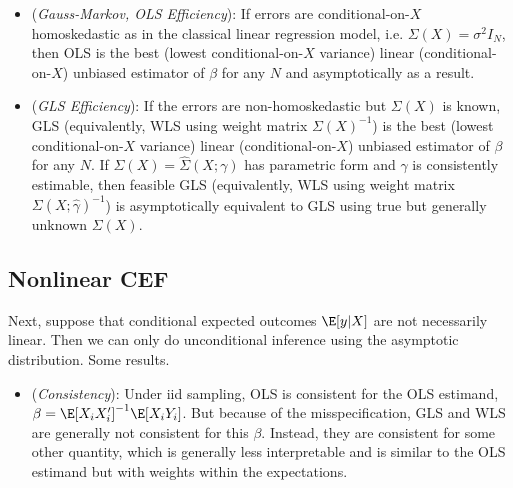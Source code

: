 \documentclass[12pt]{article}
\theoremstyle{plain}
\theoremstyle{definition}
\theoremstyle{remark}
\begin{document}
\begin{itemize}
  \item
    (\emph{Gauss-Markov, OLS Efficiency}):
    If errors are conditional-on-$X$ homoskedastic as in the
    classical linear regression model, i.e.
    $\Sigma(X)=\sigma^2 I_N$, then OLS is the best
    (lowest conditional-on-$X$ variance) linear (conditional-on-$X$)
    unbiased estimator of ${\beta}$ for any $N$ and asymptotically
    as a result.

  \item
    (\emph{GLS Efficiency}):
    If the errors are non-homoskedastic but $\Sigma(X)$ is known,
    GLS (equivalently, WLS using weight matrix $\Sigma(X)^{-1}$) is
    the best (lowest conditional-on-$X$ variance) linear
    (conditional-on-$X$) unbiased estimator of ${\beta}$ for any
    $N$.
    If $\Sigma(X)=\widehat{\Sigma}(X;\gamma)$ has parametric form
    and $\gamma$ is consistently estimable, then
    feasible GLS (equivalently, WLS using weight matrix
    ${\Sigma}(X;\hat{\gamma})^{-1}$) is asymptotically equivalent to
    GLS using true but generally unknown $\Sigma(X)$.
\end{itemize}


\subsection{Nonlinear CEF}

Next, suppose that conditional expected outcomes $\E[y|X]$ are not
necessarily linear.
Then we can only do unconditional inference using the asymptotic
distribution. Some results.
\begin{itemize}
  \item (\emph{Consistency}):
    Under iid sampling, OLS is consistent for the OLS estimand,
    $\beta=\E[X_iX_i']^{-1}\E[X_iY_i]$.
    But because of the misspecification, GLS and WLS are generally
    not consistent for this $\beta$.
    Instead, they are consistent for some other quantity, which is
    generally less interpretable and is similar to the OLS estimand
    but with weights within the expectations.
\end{itemize}





\clearpage
\end{document}
